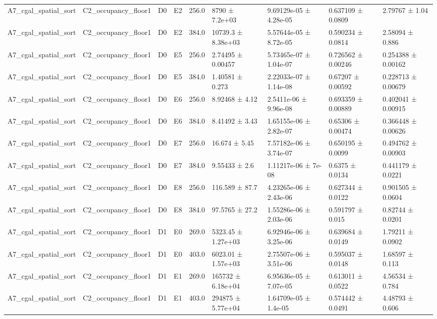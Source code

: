 \begin{table}
\begin{tabular}{lllllllll}
A7\_cgal\_spatial\_sort & C2\_occupancy\_floor1 & D0 & E2 & 256.0 & 8790 ± 7.2e+03 & 9.69129e-05 ± 4.28e-05 & 0.637109 ± 0.0809 & 2.79767 ± 1.04 \\
A7\_cgal\_spatial\_sort & C2\_occupancy\_floor1 & D0 & E2 & 384.0 & 10739.3 ± 8.38e+03 & 5.57644e-05 ± 8.72e-05 & 0.590234 ± 0.0814 & 2.58094 ± 0.886 \\
A7\_cgal\_spatial\_sort & C2\_occupancy\_floor1 & D0 & E5 & 256.0 & 2.74495 ± 0.00457 & 5.73465e-07 ± 1.04e-07 & 0.726562 ± 0.00246 & 0.254388 ± 0.00162 \\
A7\_cgal\_spatial\_sort & C2\_occupancy\_floor1 & D0 & E5 & 384.0 & 1.40581 ± 0.273 & 2.22033e-07 ± 1.14e-08 & 0.67207 ± 0.00592 & 0.228713 ± 0.00679 \\
A7\_cgal\_spatial\_sort & C2\_occupancy\_floor1 & D0 & E6 & 256.0 & 8.92468 ± 4.12 & 2.5411e-06 ± 9.96e-08 & 0.693359 ± 0.00889 & 0.402041 ± 0.00915 \\
A7\_cgal\_spatial\_sort & C2\_occupancy\_floor1 & D0 & E6 & 384.0 & 8.41492 ± 3.43 & 1.65155e-06 ± 2.82e-07 & 0.65306 ± 0.00474 & 0.366448 ± 0.00626 \\
A7\_cgal\_spatial\_sort & C2\_occupancy\_floor1 & D0 & E7 & 256.0 & 16.674 ± 5.45 & 7.57182e-06 ± 3.74e-07 & 0.650195 ± 0.0099 & 0.494762 ± 0.00903 \\
A7\_cgal\_spatial\_sort & C2\_occupancy\_floor1 & D0 & E7 & 384.0 & 9.55433 ± 2.6 & 1.11217e-06 ± 7e-08 & 0.6375 ± 0.0134 & 0.441179 ± 0.0221 \\
A7\_cgal\_spatial\_sort & C2\_occupancy\_floor1 & D0 & E8 & 256.0 & 116.589 ± 87.7 & 4.23265e-06 ± 2.43e-06 & 0.627344 ± 0.0122 & 0.901505 ± 0.0604 \\
A7\_cgal\_spatial\_sort & C2\_occupancy\_floor1 & D0 & E8 & 384.0 & 97.5765 ± 27.2 & 1.55286e-06 ± 2.03e-06 & 0.591797 ± 0.015 & 0.82744 ± 0.0201 \\
A7\_cgal\_spatial\_sort & C2\_occupancy\_floor1 & D1 & E0 & 269.0 & 5323.45 ± 1.27e+03 & 6.92946e-06 ± 3.25e-06 & 0.639684 ± 0.0149 & 1.79211 ± 0.0902 \\
A7\_cgal\_spatial\_sort & C2\_occupancy\_floor1 & D1 & E0 & 403.0 & 6023.01 ± 1.57e+03 & 2.75507e-06 ± 3.51e-06 & 0.595037 ± 0.0148 & 1.68597 ± 0.113 \\
A7\_cgal\_spatial\_sort & C2\_occupancy\_floor1 & D1 & E1 & 269.0 & 165732 ± 6.18e+04 & 6.95636e-05 ± 7.07e-05 & 0.613011 ± 0.0522 & 4.56534 ± 0.784 \\
A7\_cgal\_spatial\_sort & C2\_occupancy\_floor1 & D1 & E1 & 403.0 & 294875 ± 5.77e+04 & 1.64709e-05 ± 1.4e-05 & 0.574442 ± 0.0491 & 4.48793 ± 0.606 \\

\end{tabular}
\end{table}
